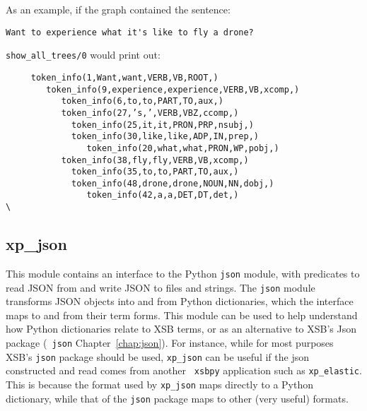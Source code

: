 \begin{itemize}
  As an example, if the graph contained the sentence:
\begin{verbatim}  
Want to experience what it's like to fly a drone?  
\end{verbatim}  
{\tt show\_all\_trees/0} would print out:
\begin{verbatim}
     token_info(1,Want,want,VERB,VB,ROOT,)
        token_info(9,experience,experience,VERB,VB,xcomp,)                                   
           token_info(6,to,to,PART,TO,aux,)                                                  
           token_info(27,’s,’,VERB,VBZ,ccomp,)                                               
             token_info(25,it,it,PRON,PRP,nsubj,)  
             token_info(30,like,like,ADP,IN,prep,)                                           
                token_info(20,what,what,PRON,WP,pobj,)                                       
           token_info(38,fly,fly,VERB,VB,xcomp,)                                              
             token_info(35,to,to,PART,TO,aux,)                                               
             token_info(48,drone,drone,NOUN,NN,dobj,)      
                token_info(42,a,a,DET,DT,det,)                                              \
\end{verbatim}
\end{itemize}  

\subsection{xp\_json}
This module contains an interface to the Python {\tt json} module,
with predicates to read JSON from and write JSON to files and strings.
The {\tt json} module transforms JSON objects into and from Python
dictionaries, which the interface maps to and from their term forms.
This module can be used to help understand how Python dictionaries
relate to XSB terms, or as an alternative to XSB's Json package ({\tt
  json} Chapter~\ref{chap:json}).  For instance, while for most
purposes XSB's {\tt json} package should be used, {\tt xp\_json} can
be useful if the json constructed and read comes from another {\tt
  xsbpy} application such as {\tt xp\_elastic}.  This is because the
format used by {\tt xp\_json} maps directly to a Python dictionary,
while that of the {\tt json} package maps to other (very useful)
formats.

